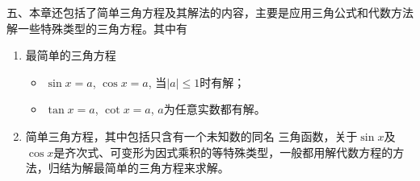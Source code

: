 五、本章还包括了简单三角方程及其解法的内容，主要是应用三角公式和代数方法解一些特殊类型的三角方程。其中有
\begin{enumerate}
    \item 最简单的三角方程
    \begin{itemize}
        \item $\sin x=a$, $\cos x=a$, 当$|a|\le 1$时有解；
        \item $\tan x=a$, $\cot x=a$, $a$为任意实数都有解。
    \end{itemize}

\item 简单三角方程，其中包括只含有一个未知数的同名
三角函数，关于$\sin x$及$\cos x$是齐次式、可变形为因式乘积的等特殊类型，一般都用解代数方程的方法，归结为解最简单的三角方程来求解。
\end{enumerate}

